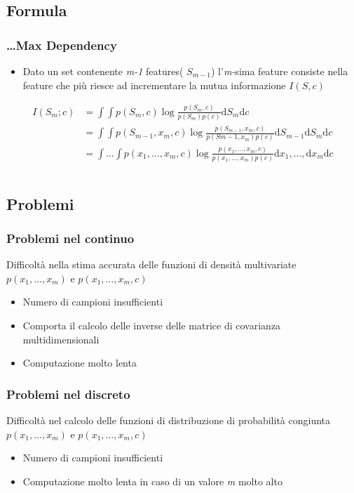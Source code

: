 \documentclass{beamer}
\begin{document}
\subsection{Formula}
\begin{frame}
	\frametitle{\dots Max Dependency}
	\begin{itemize}
		\item Dato un set contenente \emph{m-1} features( $S_{m-1}$) l'\emph{m-}sima feature consiste  nella feature che più riesce ad incrementare la mutua informazione $I(S,c)$
	\end{itemize}
	\begin{align*}
	I (S_m;c) &= \int\int p(S_m,c)\log \frac{p(S_m,c)}{p(S_m)p(c)} \mathrm{d}S_m \mathrm{d}c \\
	&= \int\int p(S_{m-1},x_m,c)\log \frac{p(S_{m-1},x_m,c)}{p(S{m-1},x_m)p(c)} \mathrm{d}S_{m-1}\mathrm{d}S_m\mathrm{d}c \\
	&=\int\dots\int p(x_1,\dots,x_m,c)\log \frac{p(x_1,\dots,x_m,c)}{p(x_1,\dots,x_m)p(c)} \mathrm{d}x_1,\dots,\mathrm{d}x_m \mathrm{d}c \\\\
	\end{align*}

\end{frame}

\subsection{Problemi}
\begin{frame}
	\frametitle{Problemi nel continuo}
	Difficoltà nella stima accurata delle funzioni di densità multivariate $p(x_1,\dots,x_m)$ e $p(x_1,\dots,x_m,c)$
	\begin{itemize}
		\item Numero di campioni insufficienti
		\item Comporta il calcolo delle inverse delle matrice di covarianza multidimensionali
		\item Computazione molto lenta
	\end{itemize}
\end{frame}

\begin{frame}
	\frametitle{Problemi nel discreto}
	Difficoltà nel calcolo delle funzioni di distribuzione di probabilità congiunta $p(x_1,\dots,x_m)$ e $p(x_1,\dots,x_m,c)$
	\begin{itemize}
		\item Numero di campioni insufficienti
		\item Computazione molto lenta in caso di un valore \emph{m} molto alto
	\end{itemize}
\end{frame}
\end{document}
